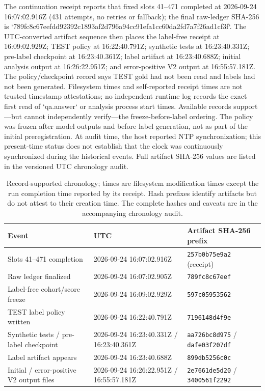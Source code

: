 \documentclass[11pt]{article}
\begin{document}
The continuation receipt reports that fixed slots 41--471 completed at 2026-09-24 16:07:02.916Z (431 attempts, no retries or fallback); the final raw-ledger SHA-256 is `789fc8c67eefdd92392c1893af2d796a94cc91efa1cc60da2fd7a7f26ad1cf3f`. The UTC-converted artifact sequence then places the label-free receipt at 16:09:02.929Z; TEST policy at 16:22:40.791Z; synthetic tests at 16:23:40.331Z; pre-label checkpoint at 16:23:40.361Z; label artifact at 16:23:40.688Z; initial analysis output at 16:26:22.951Z; and error-positive V2 output at 16:55:57.181Z. The policy/checkpoint record says TEST gold had not been read and labels had not been generated. Filesystem times and self-reported receipt times are not trusted timestamp attestations; no independent runtime log records the exact first read of `qa.answer` or analysis process start times. Available records support—but cannot independently verify—the freeze-before-label ordering. The policy was frozen after model outputs and before label generation, not as part of the initial preregistration. At audit time, the host reported NTP synchronization; this present-time status does not establish that the clock was continuously synchronized during the historical events. Full artifact SHA-256 values are listed in the versioned UTC chronology audit.

\begin{table}[t]
\centering\scriptsize
\begin{tabular}{@{}p{}p{}p{}@{}}
\toprule
Event & UTC & Artifact SHA-256 prefix \\
\midrule
Slots 41--471 completion & 2026-09-24 16:07:02.916Z & \texttt{257b0b75e9a2} (receipt) \\
Raw ledger finalized & 2026-09-24 16:07:02.905Z & \texttt{789fc8c67eef} \\
Label-free cohort/score freeze & 2026-09-24 16:09:02.929Z & \texttt{597c05953562} \\
TEST label policy written & 2026-09-24 16:22:40.791Z & \texttt{7196148d4f9e} \\
Synthetic tests / pre-label checkpoint & 2026-09-24 16:23:40.331Z / 16:23:40.361Z & \texttt{aa726bc8d975} / \texttt{dafe03f207df} \\
Label artifact appears & 2026-09-24 16:23:40.688Z & \texttt{899db5256c0c} \\
Initial / error-positive V2 output files & 2026-09-24 16:26:22.951Z / 16:55:57.181Z & \texttt{2e7661de5d20} / \texttt{3400561f2292} \\
\bottomrule
\end{tabular}
\caption{Record-supported chronology; times are filesystem modification times except the run completion time reported by its receipt. Hash prefixes identify artifacts but do not attest to their creation time. The complete hashes and caveats are in the accompanying chronology audit.}
\label{tab:chronology}
\end{table}
\end{document}
